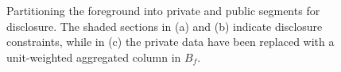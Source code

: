 \begin{figure}[t]
  \begin{center}
    
    \caption{Partitioning the foreground into private and public segments for disclosure.  The shaded sections in (a) and (b) indicate disclosure constraints, while in (c) the private data have been replaced with a unit-weighted aggregated column in $B_f$.}
    \label{fig:private}
  \end{center}
\end{figure}
